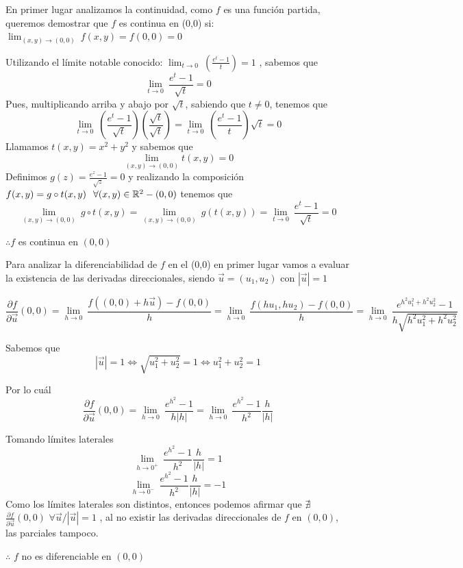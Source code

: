 \begin{solution}
    En primer lugar analizamos la continuidad, como $f$ es una función partida, queremos demostrar que $f$ es continua en (0,0) si:  $\lim_{(x,y)\to(0,0)} \ f(x,y) = f(0,0)=0$

 
Utilizando el límite notable conocido:  $ \lim_{t\to 0} \
        (\frac{e^{t}-1}{t})=1$ , sabemos que 
\[
        \lim_{t\to 0} \
        \frac{e^{t}-1}{\sqrt{t}}=0 
    \]
    Pues, multiplicando arriba y abajo por $\sqrt{t}$, sabiendo que $t\neq 0$, tenemos que
    \[
        \lim_{t\to 0} \
        (\frac{e^{t}-1}{\sqrt{t}})(\frac{\sqrt{t}}{\sqrt{t}}) =\lim_{t\to 0} \
        (\frac{e^{t}-1}{t})\sqrt{t}=0
    \]
    Llamamos  $t(x,y)=x^{2}+y^{2}$ y sabemos que 
   \[
        \lim_{(x,y)\to(0,0)} t(x,y)=0
    \]
    Definimos $g(z)=\frac{e^{z}-1}{\sqrt{z}}=0 $ y realizando la composición $f(x,y)=g\circ t(x,y) \hspace{0.25cm}\forall (x,y)\in \mathbb{R}^ 2 -(0,0)$ tenemos que
\[
        \lim_{(x,y)\to (0,0)} \
        g\circ t(x,y)=\lim_{(x,y)\to (0,0)} \
        g(t(x,y))=\lim_{t\to 0} \
        \frac{e^{t}-1}{\sqrt{t}}=0 
    \]
    
   $\therefore f$ es continua en $(0,0)$
   

    Para analizar la diferenciabilidad de $f$ en el (0,0) en primer lugar vamos a evaluar la existencia de las derivadas direccionales, siendo $\vec{u}=(u_1,u_2)$ con $|\vec{u}|=1$
    
  \[
\displaystyle\frac{\partial f}{\partial \vec{u}}(0,0)=  \lim_{h\to 0} \
        \frac{f((0,0)+h\vec{u})-f(0,0)}{h}=  \lim_{h\to 0} \
        \frac{f(hu_1,hu_2)-f(0,0)}{h}= \lim_{h\to 0} \
        \frac{e^{h^2u_1^2+h^2u_2^2}-1}{h\sqrt{h^2u_1^2+h^2u_2^2}} 
 \]
 
  Sabemos que 
         \[
       |\vec{u}|=1   \iff \sqrt{u_1^2+u_2^2}=1  \iff u_1^2+u_2^2 =1
        \]
         
          Por lo cuál
 \[
\displaystyle\frac{\partial f}{\partial \vec{u}}(0,0)=   \lim_{h\to 0} \
        \frac{e^{h^2}-1}{h|h|} = \lim_{h\to 0} \
        \frac{e^{h^2}-1}{h^2}\frac{h}{|h|}
 \]

Tomando límites laterales
\[
\lim_{h\to 0^+} \
        \frac{e^{h^2}-1}{h^2}\frac{h}{|h|}=1
        \]
\[   
    \lim_{h\to 0^-} \
    \frac{e^{h^2}-1}{h^2}\frac{h}{|h|}=-1 
\]
 Como los límites laterales son distintos, entonces podemos afirmar que $\nexists   $ 
  $ \displaystyle\frac{\partial f}{\partial \vec{u}}(0,0)    $       $     \forall \vec{u} /|\vec{u}|=1$ , al no existir las derivadas direccionales de $f$ en $(0,0)$, las parciales tampoco.

  $\therefore $  $f$ no es diferenciable en $(0,0)$
\end{solution}
